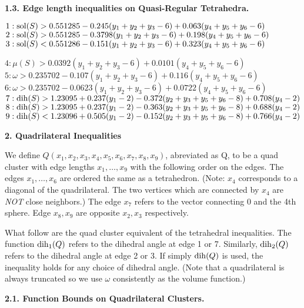{\bf 1.3. Edge length inequalities on Quasi-Regular Tetrahedra.}

\smallskip

$1: \operatorname{sol}(S) > 0.551285 - 0.245 (y_1+y_2+y_3-6) + 0.063 (y_4+y_5+y_6-6)$\newline
$2: \operatorname{sol}(S) > 0.551285 - 0.3798 (y_1+y_2+y_3-6) + 0.198 (y_4+y_5+y_6-6)$\newline
$3: \operatorname{sol}(S) < 0.551286 - 0.151 (y_1+y_2+y_3-6) + 0.323 (y_4+y_5+y_6-6)$\newline

$4: \mu(S) > 0.0392 (y_1+y_2+y_3-6) + 0.0101 (y_4+y_5+y_6-6) $\newline
$5: \omega > 0.235702 -0.107 (y_1+y_2+y_3-6) + 0.116 (y_4+y_5+y_6-6)$\newline
$6: \omega > 0.235702 -0.0623 (y_1+y_2+y_3-6) + 0.0722 (y_4+y_5+y_6-6)$\newline
$7: \operatorname{dih}(S) > 1.23095 + 0.237 (y_1-2) - 0.372 (y_2+y_3+y_5+y_6-8) + 0.708 (y_4-2) $\newline
$8: \operatorname{dih}(S) > 1.23095 + 0.237 (y_1-2) - 0.363 (y_2+y_3+y_5+y_6-8) + 0.688 (y_4-2)$\newline
$9: \operatorname{dih}(S) < 1.23096 + 0.505 (y_1-2) - 0.152(y_2+y_3+y_5+y_6-8) + 0.766 (y_4-2)$\newline



\smallskip

{\bf  2. Quadrilateral Inequalities}

\smallskip

We define $Q(x_1,x_2,x_3,x_4,x_5,x_6,x_7,x_8,x_9)$, abreviated as Q, to be a quad cluster with edge lengths $x_1,\dots, x_9$ with the following order on the edges.  The edges $x_1,\dots, x_6$ are ordered the same as a tetrahedron.  (Note: $x_4$ corresponds to a diagonal of the quadrilateral.  The two vertices which are connected by $x_4$ are {\sl NOT} close neighbors.) The edge $x_7$ refers to the vector connecting 0 and the 4th sphere.  Edge $x_8,x_9$ are opposite $x_2,x_3$ respectively.

What follow are the quad cluster equivalent of the tetrahedral inequalities.
The function $\operatorname{dih}_1(Q)$ refers to the dihedral angle at edge 1 or 7.  Similarly, $\operatorname{dih}_2(Q)$ refers to the dihedral angle at edge 2 or 3.  If simply $\operatorname{dih}(Q)$ is used, the inequality holds for any choice of dihedral angle.  (Note that a quadrilateral is always truncated so we use $\omega$ consistently as the volume function.)

{\bf 2.1. Function Bounds on Quadrilateral Clusters.}

